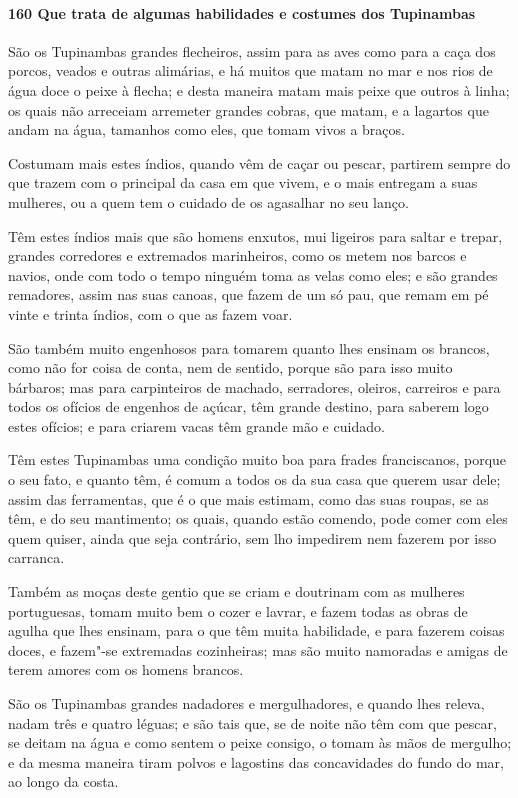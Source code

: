 \paragraph{160 Que trata de algumas habilidades e costumes dos Tupinambas}

São os Tupinambas grandes flecheiros, assim para as aves como para a caça dos porcos,
veados e outras alimárias, e há muitos que matam no mar e nos rios de água doce o peixe à
flecha; e desta maneira matam mais peixe que outros à linha; os quais não arreceiam
arremeter grandes cobras, que matam, e a lagartos que andam na água, tamanhos como eles,
que tomam vivos a braços.

Costumam mais estes índios, quando vêm de caçar ou pescar, partirem sempre do que trazem
com o principal da casa em que vivem, e o mais entregam a suas mulheres, ou a quem tem o
cuidado de os agasalhar no seu lanço.

Têm estes índios mais que são homens enxutos, mui ligeiros para saltar e trepar, grandes
corredores e extremados marinheiros, como os metem nos barcos e navios, onde com todo o
tempo ninguém toma as velas como eles; e são grandes remadores, assim nas suas canoas, que
fazem de um só pau, que remam em pé vinte e trinta índios, com o que as fazem voar.

São também muito engenhosos para tomarem quanto lhes ensinam os brancos, como não for
coisa de conta, nem de sentido, porque são para isso muito bárbaros; mas para carpinteiros
de machado, serradores, oleiros, carreiros e para todos os ofícios de engenhos de açúcar,
têm grande destino, para saberem logo estes ofícios; e para criarem vacas têm grande mão e
cuidado.

Têm estes Tupinambas uma condição muito boa para frades franciscanos, porque o seu fato, e
quanto têm, é comum a todos os da sua casa que querem usar dele; assim das ferramentas,
que é o que mais estimam, como das suas roupas, se as têm, e do seu mantimento; os quais,
quando estão comendo, pode comer com eles quem quiser, ainda que seja contrário, sem lho
impedirem nem fazerem por isso carranca.

Também as moças deste gentio que se criam e doutrinam com as mulheres portuguesas, tomam
muito bem o cozer e lavrar, e fazem todas as obras de agulha que lhes ensinam, para o que
têm muita habilidade, e para fazerem coisas doces, e fazem"-se extremadas cozinheiras; mas
são muito namoradas e amigas de terem amores com os homens brancos.

São os Tupinambas grandes nadadores e mergulhadores, e quando lhes releva, nadam três e
quatro léguas; e são tais que, se de noite não têm com que pescar, se deitam na água e
como sentem o peixe consigo, o tomam às mãos de mergulho; e da mesma maneira tiram polvos
e lagostins das concavidades do fundo do mar, ao longo da costa.

